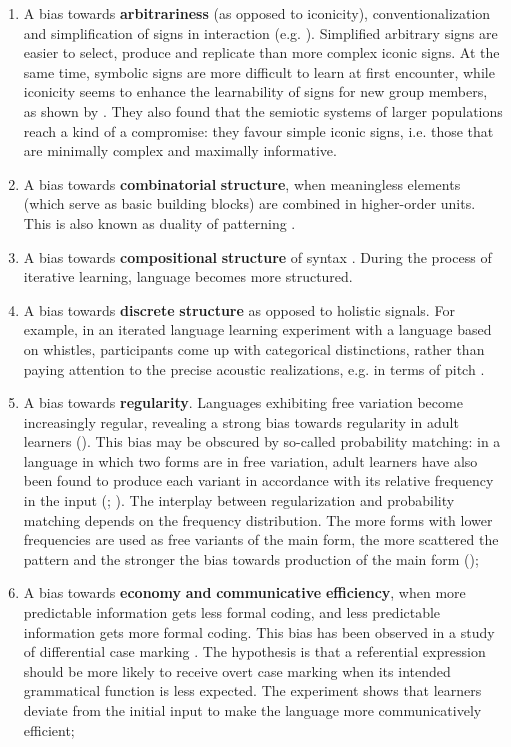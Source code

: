 \documentclass[output=paper]{langsci/langscibook}
\begin{document}
\begin{enumerate}
\item 
A bias towards \textbf{arbitrariness} (as opposed to iconicity), conventionalization and simplification of signs in interaction (e.g. \citealt{CaldwellSmith2012}). Simplified arbitrary signs are easier to select, produce and replicate than more complex iconic signs. At the same time, symbolic signs are more difficult to learn at first encounter, while iconicity seems to enhance the learnability of signs for new group members, as shown by \citet{FayEllison2013}. They also found that the semiotic systems of larger populations reach a kind of a compromise: they favour simple iconic signs, i.e. those that are minimally complex and maximally informative.
\item 
A bias towards \textbf{combinatorial} \textbf{structure}, when meaningless elements (which serve as basic building blocks) are combined in higher-order units. This is also known as duality of patterning \citep{Verhoef2012}.
\item 
A bias towards \textbf{compositional} \textbf{structure} of syntax \citep{KirbyEtAl2008}. During the process of iterative learning, language becomes more structured.
\item 
A bias towards \textbf{discrete} \textbf{structure} as opposed to holistic signals. For example, in an iterated language learning experiment with a language based on whistles, participants come up with categorical distinctions, rather than paying attention to the precise acoustic realizations, e.g. in terms of pitch \citep{Verhoef2012}.
\item 
A bias towards \textbf{regularity}. Languages exhibiting free variation become increasingly regular, revealing a strong bias towards regularity in adult learners (\citealt{SmithWonnacott2010}). This bias may be obscured by so-called probability matching: in a language in which two forms are in free variation, adult learners have also been found to produce each variant in accordance with its relative frequency in the input (\citealt{HudsonKamNewport2009}; \citealt{WonnacottNewport2005}). The interplay between regularization and probability matching depends on the frequency distribution. The more forms with lower frequencies are used as free variants of the main form, the more scattered the pattern and the stronger the bias towards production of the main form (\citealt{HudsonKamNewport2009});
\item 
A bias towards \textbf{economy} \textbf{and} \textbf{communicative} \textbf{efficiency}, when more predictable information gets less formal coding, and less predictable information gets more formal coding. This bias has been observed in a study of differential case marking \citep{FedzechkinaEtAl2012}. The hypothesis is that a referential expression should be more likely to receive overt case marking when its intended grammatical function is less expected. The experiment shows that learners deviate from the initial input to make the language more communicatively efficient;

\end{enumerate}
\end{document}
